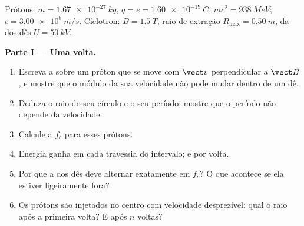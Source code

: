 \begin{problem}
\label{pb:b1:charged-particles:1}
Prótons: $m = \qty{1.67e-27}{kg}$, $q = e = \qty{1.60e-19}{C}$, $mc^2 =
\qty{938}{MeV}$; $c = \qty{3.00e8}{m/s}$. Cíclotron: $B = \qty{1.5}{T}$,
raio de extração $R_{\max} = \qty{0.50}{m}$,  da  dos dês
$U = \qty{50}{kV}$.

\medskip
\noindent\textbf{Parte I --- Uma volta.}
\begin{enumerate}
  \item Escreva a  sobre um próton que se move com $\vect v$
        perpendicular a $\vect B$, e mostre que o módulo da sua velocidade não pode mudar
        dentro de um dê.
  \item Deduza o raio do seu círculo e o seu período; mostre que o
        período não depende da velocidade.
  \item Calcule a  $f_c$ para esses prótons.
  \item Energia ganha em cada travessia do intervalo; e por volta.
  \item Por que a  dos dês deve alternar exatamente em $f_c$? O que acontece
        se ela estiver ligeiramente fora?
  \item Os prótons são injetados no centro com velocidade desprezível:
        qual o raio após a primeira volta? E após $n$ voltas?
\end{enumerate}


\end{problem}

